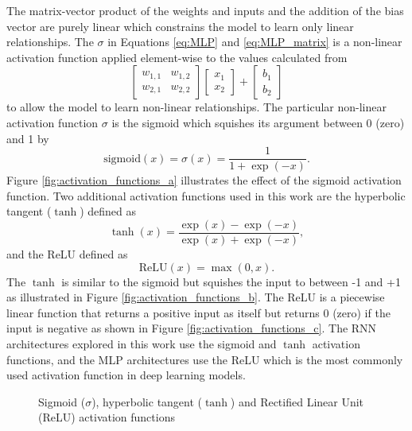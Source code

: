 The matrix-vector product of the weights and inputs and the addition of the bias vector are purely linear which constrains the model to learn only linear relationships. The $\sigma$ in Equations \ref{eq:MLP} and \ref{eq:MLP_matrix} is a non-linear activation function applied element-wise to the values calculated from 
\[
\begin{bmatrix}
	w_{1,1} & w_{1,2} \\
	w_{2,1} & w_{2,2}
\end{bmatrix}
\begin{bmatrix}
	x_{1} \\
	x_{2}
\end{bmatrix}
+
\begin{bmatrix}
	b_{1} \\
	b_{2}
\end{bmatrix}
\]
to allow the model to learn non-linear relationships. The particular non-linear activation function $\sigma$ is the sigmoid which squishes its argument between 0 (zero) and 1 by
\begin{equation} \label{eq:sigmoid}
	\text{sigmoid}\left(x\right) = \sigma \left(x\right) = \frac{1}{1 + \exp \left(-x\right)}.
\end{equation}
Figure \ref{fig:activation_functions_a} \cite{NEURIPS2019_9015} illustrates the effect of the sigmoid activation function. Two additional activation functions used in this work are the hyperbolic tangent ($\tanh$) defined as
\begin{equation} \label{eq:tanh}
	\tanh \left(x\right) = \frac{\exp \left(x\right) - \exp \left(-x\right)}{\exp \left(x\right) + \exp \left(-x\right)},
\end{equation}
and the \ac{ReLU} defined as
\begin{equation} \label{eq:relu}
	\text{ReLU} \left(x\right) = \max \left(0, x\right).
\end{equation}
The $\tanh$ is similar to the sigmoid but squishes the input to between -1 and +1 as illustrated in Figure \ref{fig:activation_functions_b}. The \ac{ReLU} is a piecewise linear function that returns a positive input as itself but returns 0 (zero) if the input is negative as shown in Figure \ref{fig:activation_functions_c}. The \ac{RNN} architectures explored in this work use the sigmoid and $\tanh$ activation functions, and the \ac{MLP} architectures use the ReLU which is the most commonly used activation function in deep learning models.
\begin{figure}[p!]
 	\centering
 	\hfill
 	\hfill
 	\caption{Sigmoid ($\sigma$), hyperbolic tangent ($\tanh$) and Rectified Linear Unit (ReLU) activation functions}
 	\label{fig:activation_functions}
\end{figure}





